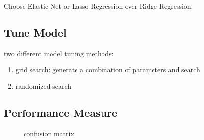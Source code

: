 Choose Elastic Net or Lasso Regression over Ridge Regression. 






\subsection{Tune Model}
two different model tuning methods:
\begin{enumerate}
	\item grid search: generate a combination of parameters and search
	\item randomized search
\end{enumerate}



\subsection{Performance Measure}

\begin{figure}[H]
\centering	
{}

\caption{confusion matrix}
\end{figure}

